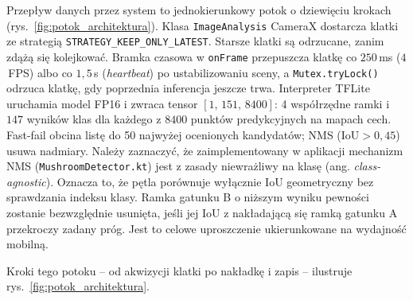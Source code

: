 Przepływ danych przez system to jednokierunkowy potok o dziewięciu krokach (rys.~\ref{fig:potok_architektura}). Klasa \texttt{ImageAnalysis} CameraX dostarcza klatki ze strategią \texttt{STRATEGY\_KEEP\_ONLY\_LATEST}. Starsze klatki są odrzucane, zanim zdążą się kolejkować. Bramka czasowa w \texttt{onFrame} przepuszcza klatkę co $250$\,ms ($4$\,FPS) albo co $1{,}5$\,s (\textit{heartbeat}) po ustabilizowaniu sceny, a \texttt{Mutex.tryLock()} odrzuca klatkę, gdy poprzednia inferencja jeszcze trwa. Interpreter TFLite uruchamia model FP16 i zwraca tensor $[1,\,151,\,8400]$: 4 współrzędne ramki i $147$ wyników klas dla każdego z $8400$ punktów predykcyjnych na mapach cech. Fast-fail obcina listę do 50 najwyżej ocenionych kandydatów; NMS ($\mathrm{IoU}>0{,}45$) usuwa nadmiary. Należy zaznaczyć, że zaimplementowany w aplikacji mechanizm NMS (\texttt{MushroomDetector.kt}) jest z zasady niewrażliwy na klasę (ang. \textit{class-agnostic}). Oznacza to, że pętla porównuje wyłącznie IoU geometryczny bez sprawdzania indeksu klasy. Ramka gatunku B o niższym wyniku pewności zostanie bezwzględnie usunięta, jeśli jej IoU z nakładającą się ramką gatunku A przekroczy zadany próg. Jest to celowe uproszczenie ukierunkowane na wydajność mobilną.

Kroki tego potoku -- od akwizycji klatki po nakładkę i zapis -- ilustruje rys.~\ref{fig:potok_architektura}.

